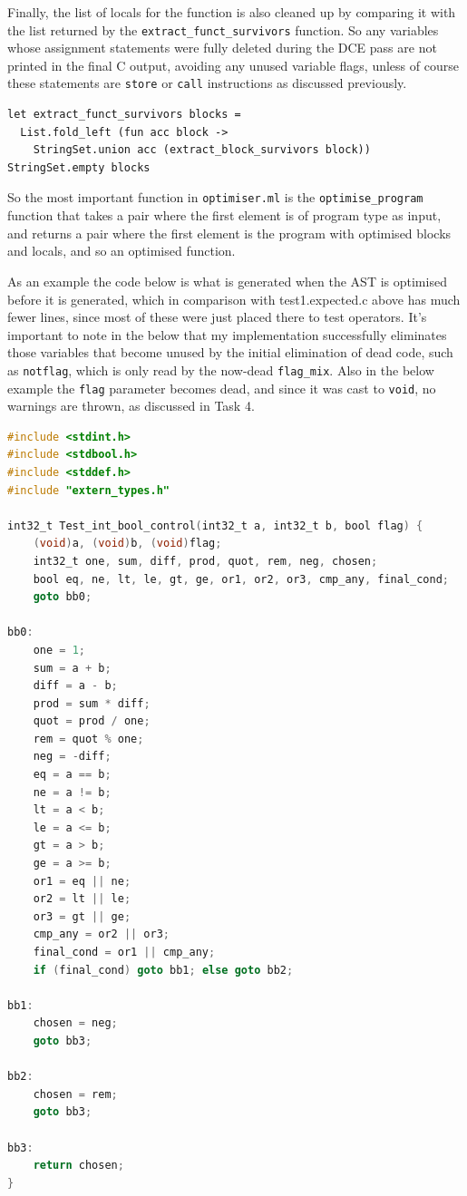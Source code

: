 \documentclass[11pt, a4paper]{article}
\begin{document}
\medskip

Finally, the list of locals for the function is also cleaned up by comparing it with the list returned by the 
\texttt{extract\_funct\_survivors} function. So any variables whose assignment statements were fully deleted
during the DCE pass are not printed in the final C output, avoiding any unused variable flags, unless of course
these statements are \texttt{store} or \texttt{call} instructions as discussed previously.

\medskip

\begin{lstlisting}[language={[Objective]Caml}]
let extract_funct_survivors blocks =
  List.fold_left (fun acc block ->
    StringSet.union acc (extract_block_survivors block)) StringSet.empty blocks
\end{lstlisting}

\medskip

So the most important function in \texttt{optimiser.ml} is the \texttt{optimise\_program} function that takes 
a pair where the first element is of program type as input, and returns a pair where the first element is the program
with optimised blocks and locals, and so an optimised function.

\medskip

As an example the code below is what is generated when the AST is optimised before it is generated, which in comparison
with test1.expected.c above has much fewer lines, since most of these were just placed there to test operators. It's 
important to note in the below that my implementation successfully eliminates those variables that become unused by the 
initial elimination of dead code, such as \texttt{notflag}, which is only read by the now-dead \texttt{flag\_mix}. Also 
in the below example the \texttt{flag} parameter becomes dead, and since it was cast to \texttt{void}, no warnings are 
thrown, as discussed in Task 4.

\medskip

\begin{lstlisting}[caption={test1.expected.c - optimised}, language=C, morekeywords={bool, int32_t, int64_t}]
#include <stdint.h>
#include <stdbool.h>
#include <stddef.h>
#include "extern_types.h"

int32_t Test_int_bool_control(int32_t a, int32_t b, bool flag) {
    (void)a, (void)b, (void)flag;
    int32_t one, sum, diff, prod, quot, rem, neg, chosen;
    bool eq, ne, lt, le, gt, ge, or1, or2, or3, cmp_any, final_cond;
    goto bb0;

bb0:
    one = 1;
    sum = a + b;
    diff = a - b;
    prod = sum * diff;
    quot = prod / one;
    rem = quot % one;
    neg = -diff;
    eq = a == b;
    ne = a != b;
    lt = a < b;
    le = a <= b;
    gt = a > b;
    ge = a >= b;
    or1 = eq || ne;
    or2 = lt || le;
    or3 = gt || ge;
    cmp_any = or2 || or3;
    final_cond = or1 || cmp_any;
    if (final_cond) goto bb1; else goto bb2;

bb1:
    chosen = neg;
    goto bb3;

bb2:
    chosen = rem;
    goto bb3;

bb3:
    return chosen;
}
\end{lstlisting}
\end{document}
